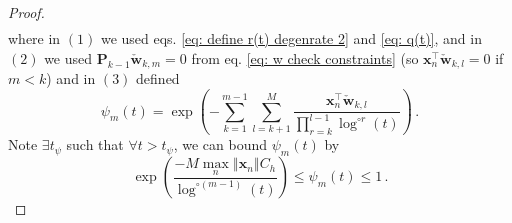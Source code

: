 \documentclass[twoside,11pt,english]{article}
\begin{document}
\begin{proof}
\begin{align}
\end{align}
where in $\left(1\right)$ we used eqs. \ref{eq: define r(t) degenrate 2}
and \ref{eq: q(t)}, and in $\left(2\right)$ we used $\mathbf{P}_{k-1}\check{\mathbf{w}}_{k,m}=0$
from eq. \ref{eq: w check constraints} (so $\mathbf{x}_{n}^{\top}\check{\mathbf{w}}_{k,l}=0$
if $m<k$) and in $\left(3\right)$ defined 
\begin{equation}
\psi_{m}\left(t\right)=\exp\left(-\sum_{k=1}^{m-1}\sum_{l=k+1}^{M}\frac{\mathbf{x}_{n}^{\top}\check{\mathbf{w}}_{k,l}}{\prod_{r=k}^{l-1}\log^{\circ r}\left(t\right)}\right)\,.
\label{eq:psi}
\end{equation}
Note $\exists t_{\psi}$ such that $\forall t>t_{\psi}$, we can bound
$\psi_{m}\left(t\right)$ by
\begin{equation}
\exp\left(\frac{-M\max_{n}\left\Vert \mathbf{x}_{n}\right\Vert C_{h}}{\log^{\circ\left(m-1\right)}\left(t\right)}\right)\leq\psi_{m}\left(t\right)\leq1\,.\label{eq: psi bound}
\end{equation}


\end{proof}
\end{document}
